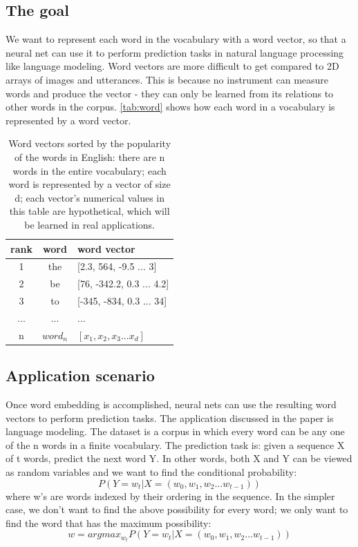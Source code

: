 \documentclass{article}
\begin{document}
\subsection{The goal}
We want to represent each word in the vocabulary with a word vector, so that a neural net can use it to perform prediction tasks in natural language processing like language modeling. Word vectors are more difficult to get compared to 2D arrays of images and utterances. This is because no instrument can measure words and produce the vector - they can only be learned from its relations to other words in the corpus. \autoref{tab:word} shows how each word in a vocabulary is represented by a word vector.
\begin{table}[h]
	\centering
	\begin{tabularx}{0.5\textwidth}{|c|c|X|} \hline
		rank & word & word vector \\ \hline
		1 & the & [2.3, 564, -9.5 ... 3] \\ \hline
		2 & be & [76, -342.2, 0.3 ... 4.2] \\ \hline
		3 & to & [-345, -834, 0.3 ... 34] \\ \hline
		... & ... & ... \\ \hline
		n & $ word_n $ & $ [x_1, x_2, x_3 ... x_d] $ \\ \hline
	\end{tabularx}
	\caption{Word vectors sorted by the popularity of the words in English: there are n words in the entire vocabulary; each word is represented by a vector of size d; each vector's numerical values in this table are hypothetical, which will be learned in real applications.}
	\label{tab:word}
\end{table}

\subsection{Application scenario}
Once word embedding is accomplished, neural nets can use the resulting word vectors to perform prediction tasks. The application discussed in the paper is language modeling. The dataset is a corpus in which every word can be any one of the n words in a finite vocabulary. The prediction task is: given a sequence X of t words, predict the next word Y. In other words, both X and Y can be viewed as random variables and we want to find the conditional probability:
\begin{equation}
P(Y = w_t|X = (w_0, w_1, w_2 ... w_{t-1}))
\end{equation}
where w's are words indexed by their ordering in the sequence. In the simpler case, we don't want to find the above possibility for every word; we only want to find the word that has the maximum possibility:
\begin{equation}
	w = argmax_{w_t}P(Y = w_t|X = (w_0, w_1, w_2 ... w_{t-1}))
\end{equation}
\end{document}
